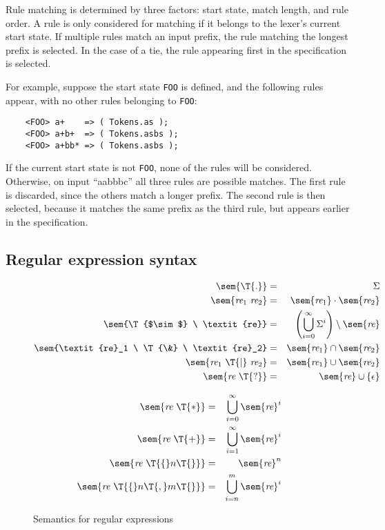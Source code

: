 Rule matching is determined by three factors: start state, match length, and rule order.  A rule is only considered for matching if it belongs to the lexer's current start state.  If multiple rules match an input prefix, the rule matching the longest prefix is selected.  In the case of a tie, the rule appearing first in the specification is selected.

For example, suppose the start state \texttt{FOO} is defined, and the following rules appear, with no other rules belonging to \texttt{FOO}:
\begin{verbatim}
    <FOO> a+    => ( Tokens.as );
    <FOO> a+b+  => ( Tokens.asbs );
    <FOO> a+bb* => ( Tokens.asbs );
\end{verbatim}
If the current start state is not \texttt{FOO}, none of the rules will be considered.  Otherwise, on input ``aabbbc'' all three rules are possible matches.  The first rule is discarded, since the others match a longer prefix.  The second rule is then selected, because it matches the same prefix as the third rule, but appears earlier in the specification.

\subsection{Regular expression syntax}

\newcommand{\REX}{\textit{re}}
\begin{figure}
\begin{minipage}[t]{.5\textwidth}
\begin{eqnarray*}
  \sem{\T{.}} &=& \Sigma \\
  \sem{\REX_1 \ \REX_2} &=& \sem{\REX_1} \cdot \sem{\REX_2} \\
  \sem{\T{$\sim$} \ \REX} &=& \left(\bigcup_{i=0}^\infty \Sigma^i\right)\setminus \sem{\REX} \\
  \sem{\REX_1 \ \T{\&} \ \REX_2} &=& \sem{\REX_1} \cap \sem{\REX_2} \\
  \sem{\REX_1 \ \T{|} \ \REX_2} &=& \sem{\REX_1} \cup \sem{\REX_2} \\
  \sem{\REX \ \T{?}} &=& \sem{\REX} \cup \{ \epsilon \}
\end{eqnarray*}
\end{minipage}\begin{minipage}[t]{.5\textwidth}
\begin{eqnarray*}
  \sem{\REX \ \T{*}} &=& \bigcup_{i=0}^\infty \sem{\REX}^i \\
  \sem{\REX \ \T{+}} &=& \bigcup_{i=1}^\infty \sem{\REX}^i \\
  \sem{\REX \ \T{\{} n \T{\}}} &=& \sem{\REX}^n \\
  \sem{\REX \ \T{\{} n \T{, } m \T{\}}} &=& \bigcup_{i=n}^m \sem{\REX}^i
\end{eqnarray*}
\end{minipage}
\caption{Semantics for regular expressions}\label{ulex-re-semantics}
\end{figure}

